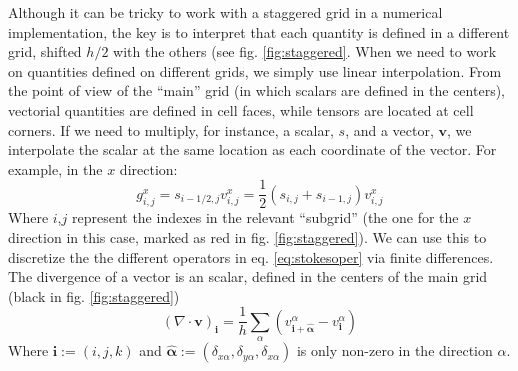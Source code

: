 \documentclass[ twoside,openright,titlepage,numbers=noenddot,%
headinclude,footinclude,cleardoublepage=empty,abstract=on,
BCOR=5mm,paper=a4,fontsize=11pt, dvipsnames
]{scrreprt}
\renewcommand{\vec}[1]{\bm{#1}}
\newcommand{\half}{\frac{1}{2}}
\begin{document}
Although it can be tricky to work with a staggered grid in a numerical implementation, the key is to interpret that each quantity is defined in a different grid, shifted $h/2$ with the others (see fig. \ref{fig:staggered}. When we need to work on quantities defined on different grids, we simply use linear interpolation.
From the point of view of the ``main'' grid (in which scalars are defined in the centers), vectorial quantities are defined in cell faces, while tensors are located at cell corners. If we need to multiply, for instance, a scalar, $s$, and a vector, $\vec{v}$, we interpolate the scalar at the same location as each coordinate of the vector. For example, in the $x$ direction:
\begin{equation}
  g^x_{i,j} = s_{i-1/2,j} v^x_{i,j} = \half( s_{i,j} + s_{i-1,j})v^x_{i,j}
\end{equation}
Where $i$,$j$ represent the indexes in the relevant ``subgrid'' (the one for the $x$ direction in this case, marked as red in fig. \ref{fig:staggered}).
We can use this to discretize the the different operators in eq. \eqref{eq:stokesoper} via finite differences.
The divergence of a vector is an scalar, defined in the centers of the main grid (black in fig. \ref{fig:staggered})
\begin{equation}
  \label{eq:staggereddiv}
  (\nabla\cdot\vec{v})_{\vec{i}} = \frac{1}{h}\sum_\alpha(v^\alpha_{\vec{i} + \vec{\hat{\alpha}}} - v^\alpha_{\vec{i}})
\end{equation}
Where $\vec{i}:=(i,j,k)$ and $\vec{\hat{\alpha}}:=(\delta_{x\alpha}, \delta_{y\alpha}, \delta_{x\alpha})$ is only non-zero in the direction $\alpha$.
\end{document}

